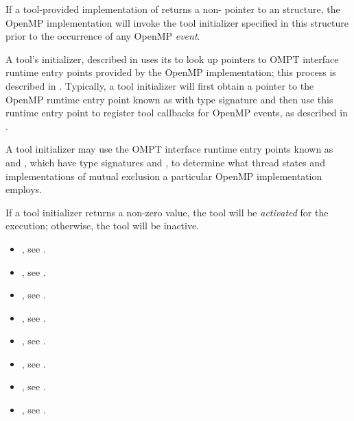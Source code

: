 If a tool-provided implementation of  returns a
non- pointer to an  structure,
the OpenMP implementation will invoke the tool initializer specified
in this structure prior to the occurrence of any OpenMP \emph{event}. 

A tool's initializer, described in 
uses its \callbackarg{}  to look up pointers
to OMPT interface runtime entry points provided by the OpenMP
implementation; this process is described in .
Typically, a tool initializer will first
obtain a pointer to the OpenMP runtime entry point known as
 with type signature
 and then use this runtime entry point to
register tool callbacks for OpenMP events, as described in
.

A tool initializer may use the OMPT interface runtime
entry points known as  and
, which have type signatures
 and
, to determine what thread
states and implementations of mutual exclusion a particular OpenMP
implementation employs. 


If a tool initializer returns a non-zero value, the tool will be
\emph{activated} for the execution; otherwise, the tool will be
inactive.

\crossreferences
\begin{itemize}
\item {}, see
  .
\item {}, see .
\item {}, see .
\item {}, see .
\item {}, see .
\item {}, see   .
\item {}, see .
\item {}, see .
\end{itemize}


